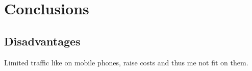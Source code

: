 \section{Conclusions}
\subsection{Disadvantages}
Limited traffic like on mobile phones, raise costs and thus me not
fit on them.

